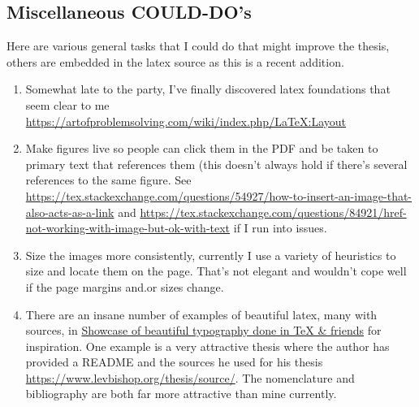 \subsection{Miscellaneous COULD-DO's}
Here are various general tasks that I could do that might improve the thesis, others are embedded in the latex source as this is a recent addition.
\begin{enumerate}
    \item Somewhat late to the party, I've finally discovered latex foundations that seem clear to me \url{https://artofproblemsolving.com/wiki/index.php/LaTeX:Layout}

    \item Make figures live so people can click them in the PDF and be taken to primary text that references them (this doesn't always hold if there's several references to the same figure. See \url{https://tex.stackexchange.com/questions/54927/how-to-insert-an-image-that-also-acts-as-a-link} and \url{https://tex.stackexchange.com/questions/84921/href-not-working-with-image-but-ok-with-text} if I run into issues.

    \item Size the images more consistently, currently I use a variety of heuristics to size and locate them on the page. That's not elegant and wouldn't cope well if the page margins and.or sizes change.

    \item There are an insane number of examples of beautiful latex, many with sources, in \href{https://tex.stackexchange.com/questions/1319/showcase-of-beautiful-typography-done-in-tex-friends}{Showcase of beautiful typography done in TeX \& friends} for inspiration. One example is a very attractive thesis where the author has provided a README and the sources he used for his thesis \url{https://www.levbishop.org/thesis/source/}. The nomenclature and bibliography are both far more attractive than mine currently.


\end{enumerate}
